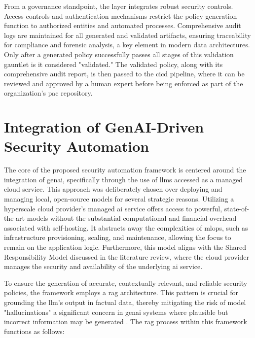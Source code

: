 From a governance standpoint, the layer integrates robust security controls. Access controls and authentication mechanisms restrict the policy generation function to authorized entities and automated processes. Comprehensive audit logs are maintained for all generated and validated artifacts, ensuring traceability for compliance and forensic analysis, a key element in modern data architectures\cite{noauthor_testbed_2025}. Only after a generated policy successfully passes all stages of this validation gauntlet is it considered "validated." The validated policy, along with its comprehensive audit report, is then passed to the \gls{cicd} pipeline, where it can be reviewed and approved by a human expert before being enforced as part of the organization's \gls{pac} repository.

\section{Integration of GenAI-Driven Security Automation} %
\label{sub:Integration of GenAI-Driven Security Automation}

The core of the proposed security automation framework is centered around the integration of \gls{genai}, specifically through the use of \glspl{llm} accessed as a managed cloud service. This approach was deliberately chosen over deploying and managing local, open-source models for several strategic reasons. Utilizing a hyperscale cloud provider's managed \gls{ai} service offers access to powerful, state-of-the-art models without the substantial computational and financial overhead associated with self-hosting. It abstracts away the complexities of \gls{mlops}, such as infrastructure provisioning, scaling, and maintenance, allowing the focus to remain on the application logic. Furthermore, this model aligns with the Shared Responsibility Model discussed in the literature review, where the cloud provider manages the security and availability of the underlying \gls{ai} service.

To ensure the generation of accurate, contextually relevant, and reliable security policies, the framework employs a \gls{rag} architecture. This pattern is crucial for grounding the \gls{llm}'s output in factual data, thereby mitigating the risk of model "hallucinations" a significant concern in \gls{genai} systems where plausible but incorrect information may be generated \cite{noauthor_ground_nodate}. The \gls{rag} process within this framework functions as follows:

